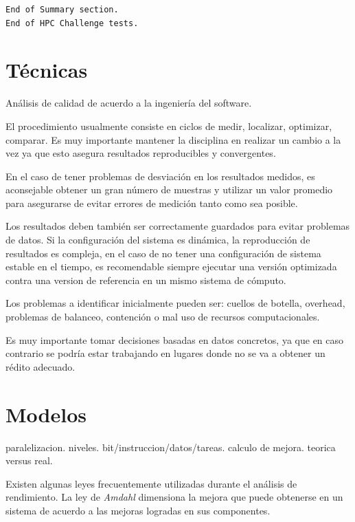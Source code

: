 \documentclass[a4paper]{report}
\begin{document}
\begin{verbatim}
End of Summary section.
End of HPC Challenge tests.
\end{verbatim}

\section{T\'ecnicas}

An\'alisis de calidad de acuerdo a la ingenier\'ia del software.

\bigskip

El procedimiento usualmente consiste en ciclos de medir, localizar, optimizar,
comparar. Es muy importante mantener la disciplina en realizar un cambio a la
vez ya que esto asegura resultados reproducibles y convergentes.

\bigskip

En el caso de tener problemas de desviaci\'on en los resultados medidos, es aconsejable obtener un gran n\'umero de muestras y utilizar
un valor promedio para asegurarse de evitar errores de medici\'on tanto como sea posible.

\bigskip

Los resultados deben tambi\'en ser correctamente guardados para evitar
problemas de datos. Si la configuraci\'on del sistema es din\'amica, la reproducci\'on de resultados es compleja, en el caso de no tener una
configuraci\'on de sistema estable en el tiempo, es recomendable siempre
ejecutar una versi\'on optimizada contra una version de referencia en un mismo
sistema de c\'omputo.

\bigskip

Los problemas a identificar inicialmente pueden ser: cuellos de botella,
overhead, problemas de balanceo, contenci\'on o mal uso de recursos
computacionales.

\bigskip

Es muy importante tomar decisiones basadas en datos concretos, ya que en
caso contrario se podr\'ia estar trabajando en lugares donde no se va a obtener
un r\'edito adecuado.

\section{Modelos}

paralelizacion. niveles. bit/instruccion/datos/tareas.
calculo de mejora. teorica versus real. 

\bigskip

Existen algunas leyes frecuentemente utilizadas durante el an\'alisis de
rendimiento. La ley de {\it Amdahl} \cite{amdahl} dimensiona la mejora que
puede obtenerse en un sistema de acuerdo a las mejoras logradas en sus
componentes.
\end{document}
